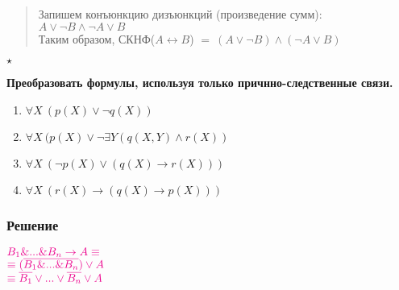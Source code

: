 \documentclass[a4paper,titlepage,oneside]{article}
\begin{document}
\begin{quote}
    Запишем конъюнкцию дизъюнкций (произведение сумм): \\
        $A \vee \neg B \wedge \neg A \vee B$ \\ 
    Таким образом, СКНФ($A \longleftrightarrow B $) $=\ (A \vee \neg B) \wedge (\neg A \vee B)$
\end{quote}
$\star$

\begin{center}
    \textbf{ Преобразовать формулы, используя только причнно-следственные связи.}
\end{center} 

\begin{enumerate}
    \item $\forall X\ (p(X) \vee \neg q(X))$
    \item $\forall X\ (p(X) \vee \neg \exists Y(q(X,Y)\wedge r(X))$
    \item $\forall X\ (\neg p(X) \vee (q(X) \rightarrow r(X)))$
    \item $\forall X\ (r(X) \rightarrow (q(X) \rightarrow p(X)))$
\end{enumerate}

\subsubsection*{Решение}

$\textcolor{magenta}{B_{1}\& ...\& B_{n} \rightarrow A \equiv }$ \\
$\textcolor{magenta}{\equiv (\overline{B_{1} \& ...\& B_{n}}) \vee A}$ \\
$\textcolor{magenta}{\equiv \overline{B_{1}} \vee ... \vee \overline{B_{n}} \vee A }$
\end{document}
